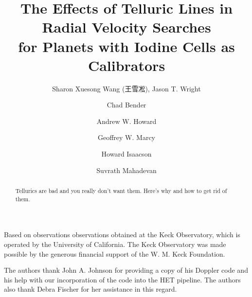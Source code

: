 \documentclass{emulateapj}
\begin{document}

\begin{CJK*}{UTF8}{gbsn}

\title
{
The Effects of Telluric Lines in Radial Velocity Searches\\
for Planets with Iodine Cells as Calibrators
}

{
Based on observations observations obtained at the Keck Observatory,
which is operated by the University of California. The Keck
Observatory was made possible by the generous financial support of the
W. M. Keck Foundation.
}

\author{Sharon Xuesong Wang (王雪凇),
  Jason T. Wright} %
\author{Chad Bender} %
\author{Andrew W. Howard} %
\author{Geoffrey W. Marcy} %
\author{Howard Isaacson} %
\author{Suvrath Mahadevan} %







\begin{abstract}

Tellurics are bad and you really don't want them. Here's why and how to get
rid of them.

\end{abstract}






\acknowledgements
The authors thank John A. Johnson for providing a copy of his Doppler
code and his help with our incorporation of the code into the HET
pipeline.  The authors also thank Debra Fischer for her assistance in
this regard.


\end{CJK*}
\end{document}

